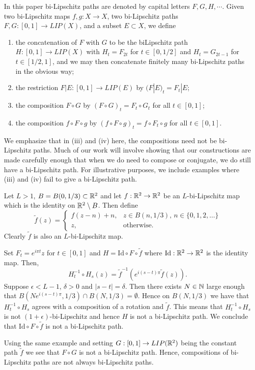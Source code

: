 \documentclass{amsart}
\begin{document}
In this paper bi-Lipschitz paths are denoted by capital letters $F,G,H, \cdots$. Given two bi-Lipschitz maps $f,g:X\to X$, two bi-Lipschitz paths $F,G: [0,1] \to LIP(X)$, and a subset $E\subset X$, we define
\begin{enumerate}
\item the concatenation of $F$ with $G$ to be the biLipschitz path $H: [0,1] \to LIP(X)$ with $H_t = F_{2t}$ for $t\in [0,1/2]$ and $H_{t} = G_{2t-1}$ for $t\in [1/2,1]$, and we may then concatenate finitely many bi-Lipschitz paths in the obvious way;
\item the restriction $F|E : [0,1] \to LIP(E)$ by $(F|E)_t = F_t|E$;
\item the composition $F\circ G$ by $(F\circ G)_t = F_t \circ G_t$ for all $t\in [0,1]$;
\item the composition $f\circ F\circ g$ by $(f\circ F\circ g)_t = f\circ F_t \circ g$ for all $t\in [0,1]$.
\end{enumerate}

We emphasize that in (iii) and (iv) here, the compositions need not be bi-Lipschitz paths. Much of our work will involve showing that our constructions are made carefully enough that when we do need to compose or conjugate, we do still have a bi-Lipschitz path. For illustrative purposes, we include examples where (iii) and (iv) fail to give a bi-Lipschitz path.

\begin{example}
\label{ex:1}
Let $L>1$, $B = B(0,1/3) \subset \mathbb{R}^2$ and let $f:\mathbb{R}^2\to \mathbb{R}^2$ be an $L$-bi-Lipschitz map which is the identity on $\mathbb{R}^2 \setminus B$. Then define
\begin{equation*} 
\widetilde{f}(z) = \begin{cases}
 f( z-n) + n, & \text{$z\in B(n,1/3)$, $n\in \{0,1,2,\ldots \}$} \\ 
z,  & \text{otherwise.} \end{cases} 
\end{equation*}
Clearly $\widetilde{f}$ is also an $L$-bi-Lipschitz map.

Set $F_t =  e^{i\pi t} z$ for $t\in [0,1]$ and $H = \text{Id}\circ F\circ \tilde{f}$ where $\text{Id}:\mathbb{R}^2 \to \mathbb{R}^2$ is the identity map. Then,
\[ H_t^{-1} \circ H_s (z) = \widetilde{f}^{-1} ( e^{i(s-t)\pi} \widetilde{f}(z)).\]
Suppose $\epsilon <L-1$, $\delta >0$ and $|s-t| = \delta$. Then there exists $N\in \mathbb{N}$ large enough that $ B(Ne^{i(s-t)\pi} , 1/3) \cap B(N,1/3) = \emptyset$. Hence on $B(N,1/3)$ we have that $H_t^{-1} \circ H_s$ agrees with a composition of a rotation and $\widetilde{f}$. This means that $H_t^{-1} \circ H_s$ is not $(1+\epsilon)$-bi-Lipschitz and hence $H$ is not a bi-Lipschitz path.
We conclude that $\text{Id}\circ F\circ \tilde{f}$ is not a bi-Lipschitz path.

Using the same example and setting $G:[0,1] \to LIP(\mathbb{R}^2)$ being the constant path $\tilde{f}$ we see that $F\circ G$ is not a bi-Lipschitz path. Hence, compositions of bi-Lipschitz paths are not always bi-Lipschitz paths.
\end{example}
\end{document}
